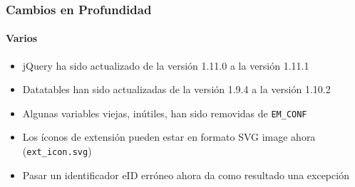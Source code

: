 \begin{frame}[fragile]
	\frametitle{Cambios en Profundidad}
	\framesubtitle{Varios}

	\begin{itemize}
		\item jQuery ha sido actualizado de la versión 1.11.0 a la versión 1.11.1 
		\item Datatables han sido actualizadas de la versión 1.9.4 a la versión 1.10.2
		\item Algunas variables viejas, inútiles, han sido removidas de \texttt{EM\_CONF}
		\item Los íconos de extensión pueden estar en formato SVG image ahora (\texttt{ext\_icon.svg})
		\item Pasar un identificador eID erróneo ahora da como resultado una excepción
	\end{itemize}

\end{frame}

